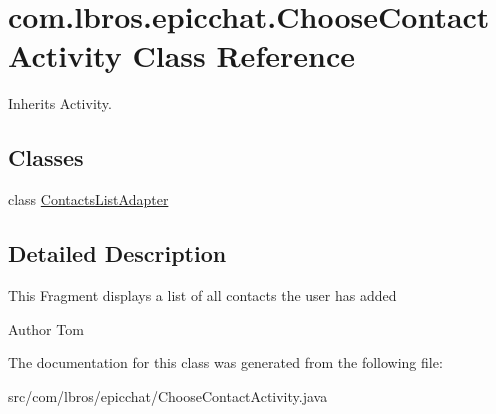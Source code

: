 \hypertarget{classcom_1_1lbros_1_1epicchat_1_1_choose_contact_activity}{\section{com.\-lbros.\-epicchat.\-Choose\-Contact\-Activity Class Reference}
\label{classcom_1_1lbros_1_1epicchat_1_1_choose_contact_activity}
}


Inherits Activity.

\subsection*{Classes}
\begin{DoxyCompactItemize}
\item 
class \hyperlink{classcom_1_1lbros_1_1epicchat_1_1_choose_contact_activity_1_1_contacts_list_adapter}{Contacts\-List\-Adapter}
\end{DoxyCompactItemize}


\subsection{Detailed Description}
This Fragment displays a list of all contacts the user has added \begin{DoxyAuthor}{Author}
Tom 
\end{DoxyAuthor}


The documentation for this class was generated from the following file\-:\begin{DoxyCompactItemize}
\item 
src/com/lbros/epicchat/Choose\-Contact\-Activity.\-java\end{DoxyCompactItemize}
